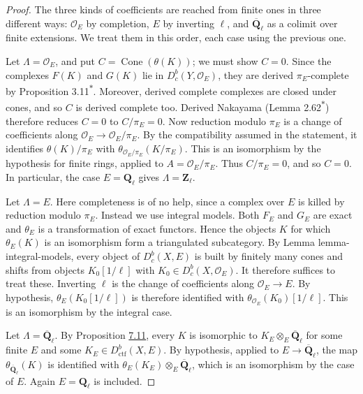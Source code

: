 \documentclass[11pt]{article}
\newcommand{\bpout}[1]{#1\textsuperscript{\hyperlink{bp-outside}{\ensuremath{\ast}}}}
\providecommand{\Cone}{}\renewcommand{\Cone}{\operatorname{Cone}}
\providecommand{\Dbc}{}\renewcommand{\Dbc}{D^b_c}
\begin{document}
\begin{proof}[{Proof}]\label{bp35}%
The three kinds of coefficients are reached from finite ones in three different ways: \(\mathcal O_E\) by completion, \(E\) by inverting \(\ell\), and \(\overline{\mathbf Q}_\ell\) as a colimit over finite extensions. We treat them in this order, each case using the previous one.

Let \(\Lambda=\mathcal O_E\), and put \(C=\Cone(\theta(K))\); we must show \(C=0\). Since the complexes \(F(K)\) and \(G(K)\) lie in \(\Dbc(Y,\mathcal O_E)\), they are derived \(\pi_E\)-complete by Proposition \bpout{3.11}. Moreover, derived complete complexes are closed under cones, and so \(C\) is derived complete too. Derived Nakayama (Lemma \bpout{2.62}) therefore reduces \(C=0\) to \(C/\pi_E=0\). Now reduction modulo \(\pi_E\) is a change of coefficients along \(\mathcal O_E\to\mathcal O_E/\pi_E\). By the compatibility assumed in the statement, it identifies \(\theta(K)/\pi_E\) with \(\theta_{\mathcal O_E/\pi_E}(K/\pi_E)\). This is an isomorphism by the hypothesis for finite rings, applied to \(A=\mathcal O_E/\pi_E\). Thus \(C/\pi_E=0\), and so \(C=0\). In particular, the case \(E=\mathbf Q_\ell\) gives \(\Lambda=\mathbf Z_\ell\).

Let \(\Lambda=E\). Here completeness is of no help, since a complex over \(E\) is killed by reduction modulo \(\pi_E\). Instead we use integral models. Both \(F_E\) and \(G_E\) are exact and \(\theta_E\) is a transformation of exact functors. Hence the objects \(K\) for which \(\theta_E(K)\) is an isomorphism form a triangulated subcategory. By Lemma lemma-integral-models, every object of \(\Dbc(X,E)\) is built by finitely many cones and shifts from objects \(K_0[1/\ell]\) with \(K_0\in\Dbc(X,\mathcal O_E)\). It therefore suffices to treat these. Inverting \(\ell\) is the change of coefficients along \(\mathcal O_E\to E\). By hypothesis, \(\theta_E(K_0[1/\ell])\) is therefore identified with \(\theta_{\mathcal O_E}(K_0)[1/\ell]\). This is an isomorphism by the integral case.

Let \(\Lambda=\overline{\mathbf Q}_\ell\). By Proposition \hyperref[bp29]{7.11}, every \(K\) is isomorphic to \(K_E\otimes_E\overline{\mathbf Q}_\ell\) for some finite \(E\) and some \(K_E\in D^b_{\mathrm{ctf}}(X,E)\). By hypothesis, applied to \(E\to\overline{\mathbf Q}_\ell\), the map \(\theta_{\overline{\mathbf Q}_\ell}(K)\) is identified with \(\theta_E(K_E)\otimes_E\overline{\mathbf Q}_\ell\), which is an isomorphism by the case of \(E\). Again \(E=\mathbf Q_\ell\) is included.
\end{proof}
\end{document}
